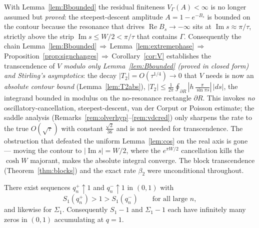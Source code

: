 \begin{remark}\label{rem:Vreduced}
With Lemma~\ref{lem:Bbounded} the residual finiteness $V_\Gamma(A)<\infty$ is no longer assumed but
\emph{proved}: the steepest-descent amplitude $A=1-e^{-B_s}$ is bounded on the contour because the
resonance that drives $\operatorname{Re}B_s\to-\infty$ sits at $\operatorname{Im}s\approx\pi/\tau$,
strictly above the strip $\operatorname{Im}s\le W/2<\pi/\tau$ that contains $\Gamma$. Consequently the
chain Lemma~\ref{lem:Bbounded}\,$\Rightarrow$\,Lemma~\ref{lem:extremephase}\,$\Rightarrow$\,
Proposition~\ref{prop:signchanges}\,$\Rightarrow$\,Corollary~\ref{cor:V} establishes the transcendence
of $V$ \emph{modulo only Lemma~\ref{lem:Bbounded} \textup(proved in closed form\textup) and Stirling's
asymptotics}: the decay $|T_2|=O(\tau^{1/4})\to0$ that $V$ needs is now an \emph{absolute contour bound}
(Lemma~\ref{lem:T2abs}), $|T_2|\le\tfrac1{2\pi}\oint_{\partial R}|h\,\tfrac{\pi}{\sin\pi s}|\,|ds|$, the
integrand bounded in modulus on the no-resonance rectangle $\partial R$. This invokes \emph{no}
oscillatory-cancellation, steepest-descent, van der Corput or Poisson estimate; the saddle analysis
(Remarks~\ref{rem:olverhyp}--\ref{rem:vdcred}) only sharpens the rate to the true $O(\sqrt\tau)$ with constant
$\tfrac{\sqrt2}{36}$ and is not needed for transcendence. The obstruction that defeated the uniform Lemma~\ref{lem:cos} on the real axis is
gone --- moving the contour to $|\operatorname{Im}s|=W/2$, where the $e^{\pi W/2}$ cancellation kills the
$\cosh W$ majorant, makes the absolute integral converge. The block transcendence
(Theorem~\ref{thm:blocks}) and the exact rate $\beta_2$ were unconditional throughout.
\end{remark}

\begin{proposition}\label{prop:signchanges}
There exist sequences $q_n^{+}\uparrow1$ and $q_n^{-}\uparrow1$ in $(0,1)$ with
\[
  S_1(q_n^{+})>1>S_1(q_n^{-})\qquad\text{for all large }n,
\]
and likewise for $\Sigma_1$. Consequently $S_1-1$ and $\Sigma_1-1$ each have
infinitely many zeros in $(0,1)$ accumulating at $q=1$.
\end{proposition}

